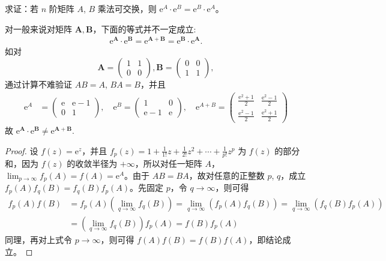 \documentclass[../../main.tex]{subfiles}
\begin{document}
\begin{proposition}\label{proposition:若A,B乘法可交换,则e^A,e^B也乘法可交换}
求证：若 $n$ 阶矩阵 $A$, $B$ 乘法可交换，则 $\mathrm{e}^A\cdot\mathrm{e}^B = \mathrm{e}^B\cdot\mathrm{e}^A$。
\end{proposition}
\begin{remark}
对一般来说对矩阵 $\boldsymbol{A},\boldsymbol{B}$，下面的等式并不一定成立:
\begin{align*}
\mathrm{e}^{\boldsymbol{A}}\cdot\mathrm{e}^{\boldsymbol{B}}=\mathrm{e}^{\boldsymbol{A}+\boldsymbol{B}}=\mathrm{e}^{\boldsymbol{B}}\cdot\mathrm{e}^{\boldsymbol{A}}.
\end{align*}
如对
\[
\boldsymbol{A}=\begin{pmatrix}
1 & 1 \\
0 & 0
\end{pmatrix}, \boldsymbol{B}=\begin{pmatrix}
0 & 0 \\
1 & 1
\end{pmatrix},
\]
通过计算不难验证 $AB = A$, $BA = B$，并且
\begin{align*}
\mathrm{e}^A &= 
\begin{pmatrix}
\mathrm{e} & \mathrm{e} - 1 \\
0 & 1
\end{pmatrix}, \quad
\mathrm{e}^B = 
\begin{pmatrix}
1 & 0 \\
\mathrm{e} - 1 & \mathrm{e}
\end{pmatrix}, \quad
\mathrm{e}^{A + B} = 
\begin{pmatrix}
\frac{\mathrm{e}^2 + 1}{2} & \frac{\mathrm{e}^2 - 1}{2} \\
\frac{\mathrm{e}^2 - 1}{2} & \frac{\mathrm{e}^2 + 1}{2}
\end{pmatrix}
\end{align*} 
故
$\mathrm{e}^{\boldsymbol{A}}\cdot\mathrm{e}^{\boldsymbol{B}}\neq\mathrm{e}^{\boldsymbol{A}+\boldsymbol{B}}$. 
\end{remark}
\begin{proof}
设 $f(z)=\mathrm{e}^z$，并且 $f_p(z)=1+\frac{1}{1!}z+\frac{1}{2!}z^2+\cdots+\frac{1}{p!}z^p$ 为 $f(z)$ 的部分和，因为 $f(z)$ 的收敛半径为 $+\infty$，所以对任一矩阵 $A$，$\lim_{p\to\infty}f_p(A)=f(A)=\mathrm{e}^A$。由于 $AB = BA$，故对任意的正整数 $p$, $q$，成立 $f_p(A)f_q(B)=f_q(B)f_p(A)$。先固定 $p$，令 $q\to\infty$，则可得
\begin{align*}
f_p(A)f(B) &= f_p(A)\left(\lim_{q\to\infty}f_q(B)\right)=\lim_{q\to\infty}\left(f_p(A)f_q(B)\right)=\lim_{q\to\infty}\left(f_q(B)f_p(A)\right)\\
&=\left(\lim_{q\to\infty}f_q(B)\right)f_p(A)=f(B)f_p(A)
\end{align*}
同理，再对上式令 $p\to\infty$，则可得 $f(A)f(B)=f(B)f(A)$，即结论成立。 
\end{proof}
\end{document}

